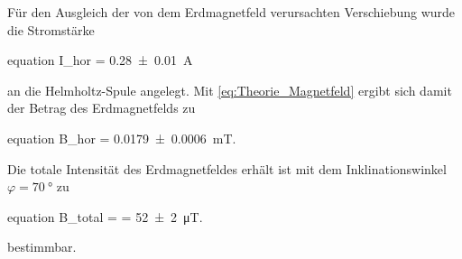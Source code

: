 		Für den Ausgleich der von dem Erdmagnetfeld verursachten Verschiebung wurde die Stromstärke
 		\begin{empheq}{equation}
 			I_{hor} = \SI{0.28(1)}{\ampere}
 		\end{empheq}
		an die Helmholtz-Spule angelegt. Mit \cref{eq:Theorie_Magnetfeld} 
		ergibt sich damit der Betrag des Erdmagnetfelds zu 
 		\begin{empheq}{equation}
 			B_{hor} = \SI{0.0179(6)}{\milli\tesla}.
 		\end{empheq}
 		
 		Die totale Intensität des Erdmagnetfeldes erhält ist mit dem Inklinationswinkel 
 		$\varphi = \SI{70}{\degree}$ zu
 		\begin{empheq}{equation}
 			\label{eq:Auswertung_Btotal}
 			B_{total} =  = \SI{52(2)}{\micro\tesla}.
 		\end{empheq}
 		bestimmbar.
